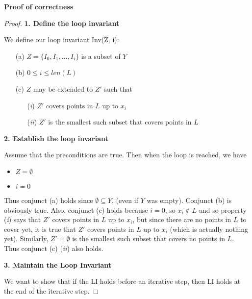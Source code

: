 \vspace{1 em}

\textbf{Proof of correctness}

\begin{proof}
    \textbf{1. Define the loop invariant}
    
    We define our loop invariant Inv(Z, i):
    \begin{itemize}
        \item [(a)] $Z = \{ I_0, I_1, \dots, I_i \}$ is a subset of $Y$
        \item [(b)] $0 \leqslant i \leqslant len(L)$
        \item [(c)] $Z$ may be extended to $Z'$ such that
        \begin{itemize}
            \item [(\emph{i})] $Z'$ covers points in $L$ up to $x_i$
            \item [(\emph{ii})] $Z'$ is the smallest such subset that covers points in $L$
        \end{itemize}
    \end{itemize}
    
    \newpage
    
    \base 
    
    \textbf{2. Establish the loop invariant}
    
    Assume that the preconditions are true. Then when the loop is reached, we have
    \begin{itemize}
        \item $Z = \emptyset$
        \item $i = 0$
    \end{itemize}
    Thus conjunct (a) holds since $\emptyset \subseteq Y$, (even if $Y$ was empty).
    Conjunct (b) is obviously true. Also, conjunct (c) holds because $i = 0$, so
    $x_i \not \in L$ and so property (\emph{i}) says that $Z'$ covers points
    in $L$ up to $x_i$, but since there are no points in $L$ to cover yet, it is
    true that $Z'$ covers points in $L$ up to $x_i$ (which is actually nothing yet).
    Similarly, $Z' = \emptyset$ is the 
    smallest such subset that covers no points in $L$. Thus conjunct (c) (\emph{ii}) also
    holds.
    
    \istep
    
    \textbf{3. Maintain the Loop Invariant}
    
    We want to show that if the LI holds before an iterative step, 
    then LI holds at the end of the iterative step.
    

\end{proof}
